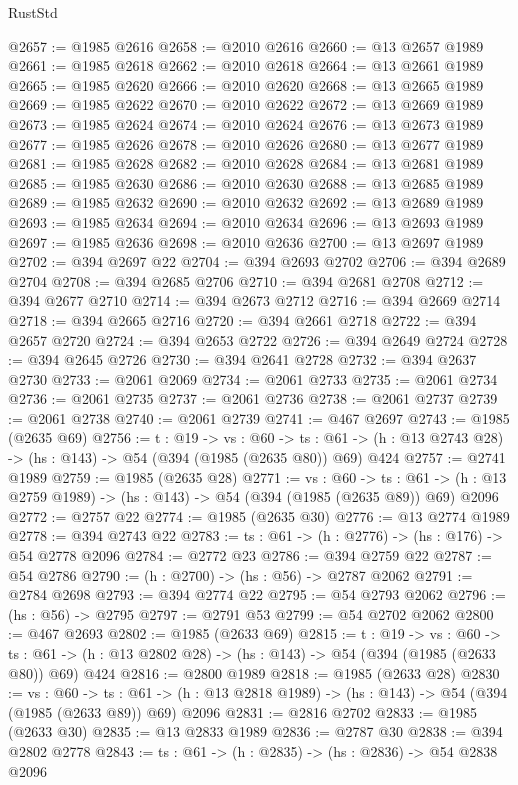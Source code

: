 \begin{lexlean}{RustStd}
\begin{coremodule}
{\begin{coremodule}
{{{{{{{{@2657 := @1985 @2616
@2658 := @2010 @2616
@2660 := @13 @2657 @1989
@2661 := @1985 @2618
@2662 := @2010 @2618
@2664 := @13 @2661 @1989
@2665 := @1985 @2620
@2666 := @2010 @2620
@2668 := @13 @2665 @1989
@2669 := @1985 @2622
@2670 := @2010 @2622
@2672 := @13 @2669 @1989
@2673 := @1985 @2624
@2674 := @2010 @2624
@2676 := @13 @2673 @1989
@2677 := @1985 @2626
@2678 := @2010 @2626
@2680 := @13 @2677 @1989
@2681 := @1985 @2628
@2682 := @2010 @2628
@2684 := @13 @2681 @1989
@2685 := @1985 @2630
@2686 := @2010 @2630
@2688 := @13 @2685 @1989
@2689 := @1985 @2632
@2690 := @2010 @2632
@2692 := @13 @2689 @1989
@2693 := @1985 @2634
@2694 := @2010 @2634
@2696 := @13 @2693 @1989
@2697 := @1985 @2636
@2698 := @2010 @2636
@2700 := @13 @2697 @1989
@2702 := @394 @2697 @22
@2704 := @394 @2693 @2702
@2706 := @394 @2689 @2704
@2708 := @394 @2685 @2706
@2710 := @394 @2681 @2708
@2712 := @394 @2677 @2710
@2714 := @394 @2673 @2712
@2716 := @394 @2669 @2714
@2718 := @394 @2665 @2716
@2720 := @394 @2661 @2718
@2722 := @394 @2657 @2720
@2724 := @394 @2653 @2722
@2726 := @394 @2649 @2724
@2728 := @394 @2645 @2726
@2730 := @394 @2641 @2728
@2732 := @394 @2637 @2730
@2733 := @2061 @2069
@2734 := @2061 @2733
@2735 := @2061 @2734
@2736 := @2061 @2735
@2737 := @2061 @2736
@2738 := @2061 @2737
@2739 := @2061 @2738
@2740 := @2061 @2739
@2741 := @467 @2697
@2743 := @1985 (@2635 @69)
@2756 := {t : @19} ->
  {vs : @60} ->
  {ts : @61} -> (h : @13 @2743 @28) -> (hs : @143) -> @54 (@394 (@1985 (@2635 @80)) @69) @424
@2757 := @2741 @1989
@2759 := @1985 (@2635 @28)
@2771 := {vs : @60} ->
  {ts : @61} -> (h : @13 @2759 @1989) -> (hs : @143) -> @54 (@394 (@1985 (@2635 @89)) @69) @2096
@2772 := @2757 @22
@2774 := @1985 (@2635 @30)
@2776 := @13 @2774 @1989
@2778 := @394 @2743 @22
@2783 := {ts : @61} -> (h : @2776) -> (hs : @176) -> @54 @2778 @2096
@2784 := @2772 @23
@2786 := @394 @2759 @22
@2787 := @54 @2786
@2790 := (h : @2700) -> (hs : @56) -> @2787 @2062
@2791 := @2784 @2698
@2793 := @394 @2774 @22
@2795 := @54 @2793 @2062
@2796 := (hs : @56) -> @2795
@2797 := @2791 @53
@2799 := @54 @2702 @2062
@2800 := @467 @2693
@2802 := @1985 (@2633 @69)
@2815 := {t : @19} ->
  {vs : @60} ->
  {ts : @61} -> (h : @13 @2802 @28) -> (hs : @143) -> @54 (@394 (@1985 (@2633 @80)) @69) @424
@2816 := @2800 @1989
@2818 := @1985 (@2633 @28)
@2830 := {vs : @60} ->
  {ts : @61} -> (h : @13 @2818 @1989) -> (hs : @143) -> @54 (@394 (@1985 (@2633 @89)) @69) @2096
@2831 := @2816 @2702
@2833 := @1985 (@2633 @30)
@2835 := @13 @2833 @1989
@2836 := @2787 @30
@2838 := @394 @2802 @2778
@2843 := {ts : @61} -> (h : @2835) -> (hs : @2836) -> @54 @2838 @2096
}}}}}}}}
\end{coremodule}}
\end{coremodule}
\end{lexlean}
